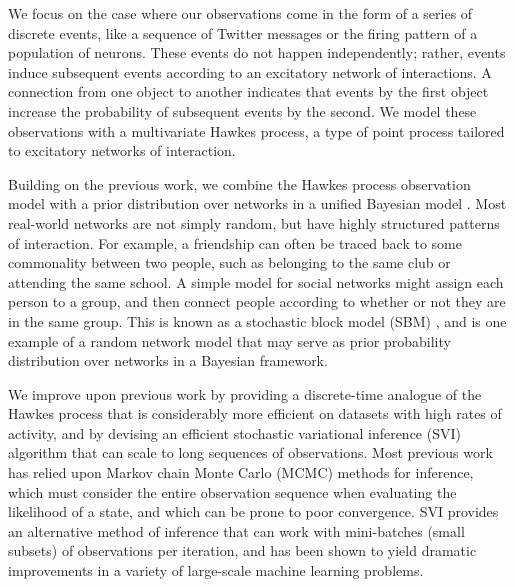 We focus on the case where our observations come in the form of a series of discrete events, like a sequence of Twitter messages or the firing pattern of a population of neurons.
These events do not happen independently; rather, events induce subsequent events according to an excitatory network of interactions.
A connection from one object to another indicates that events by the first object increase the probability of subsequent events by the second.
We model these observations with a multivariate Hawkes process, a type of point process tailored to excitatory networks of interaction.

Building on the previous work, we combine the Hawkes process observation model with a prior distribution over networks in a unified Bayesian model \cite{Simma-2010, Blundell-2012, Perry-2013, Dubois-2013, Linderman-2014, Guo-2014}.
Most real-world networks are not simply random, but have highly structured patterns of interaction.
For example, a friendship can often be traced back to some commonality between two people, such as belonging to the same club or attending the same school.
A simple model for social networks might assign each person to a group, and then connect people according to whether or not they are in the same group.
This is known as a stochastic block model (SBM) \cite{Nowicki-2001}, and is one example of a random network model that may serve as prior probability distribution over networks in a Bayesian framework.

We improve upon previous work by providing a discrete-time analogue of the Hawkes process that is considerably more efficient on datasets with high rates of activity, and by devising an efficient stochastic variational inference (SVI) algorithm that can scale to long sequences of observations.
Most previous work has relied upon Markov chain Monte Carlo (MCMC) methods for inference,  which must consider the entire observation sequence when evaluating the likelihood of a state, and which can be prone to poor convergence.
SVI provides an alternative method of inference that can work with mini-batches (small subsets) of observations per iteration, and has been shown to yield dramatic improvements in a variety of large-scale machine learning problems.

